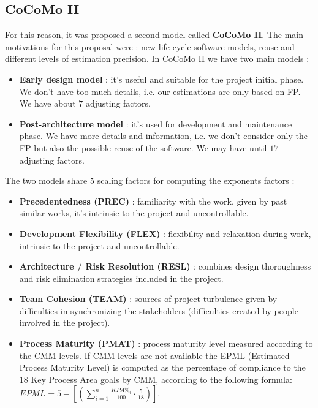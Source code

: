 \subsection{CoCoMo II}
For this reason, it was proposed a second model called \textbf{CoCoMo II}. The main motivations for this proposal were : new life cycle software models, reuse and different levels of estimation precision.  In CoCoMo II we have two main models :
\begin{itemize}
    \item \textbf{Early design model} : it's useful and suitable for the project initial phase. We don't have too much details, i.e. our estimations are only based on FP. We have about $7$ adjusting factors.
    \item \textbf{Post-architecture model} : it's used for development and maintenance phase. We have more details and information, i.e. we don't consider only the FP but also the possible reuse of the software. We may have until $17$ adjusting factors.
\end{itemize}
The two models share $5$ scaling factors for computing the exponents factors :
\begin{itemize}
    \item \textbf{Precedentedness (PREC)} : familiarity with the work, given by past similar
          works, it’s intrinsic to the project and uncontrollable.
    \item \textbf{Development Flexibility (FLEX)} : flexibility and relaxation during work, intrinsic to the project and uncontrollable.
    \item \textbf{Architecture / Risk Resolution (RESL)} : combines design thoroughness and risk elimination strategies included in the project.
    \item \textbf{Team Cohesion (TEAM)} : sources of project turbulence given by difficulties
          in synchronizing the stakeholders (difficulties created by people involved in the project).
    \item \textbf{Process Maturity (PMAT)} : process maturity level measured according to the CMM-levels. If CMM-levels are not available the EPML (Estimated Process Maturity Level) is computed as the percentage of compliance to the 18 Key Process Area goals by CMM, according to the following formula: $EPML = 5 - [( \sum_{i=1}^{n} \frac{KPA\%_i}{100} \cdot \frac{5}{18})]$.
\end{itemize}
